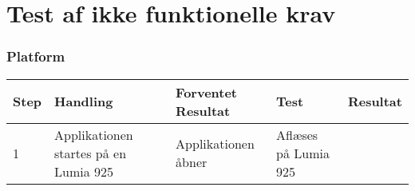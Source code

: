 \chapter{Test af ikke funktionelle krav}
 \label{chp:testikkefunktionelle}
 

\subsection{Platform}

\begin{longtable}{| p{0.7cm}  | p{3cm}  | p{4cm} |  p{3cm}  | p{3cm}  |}
\hline
Step & Handling & Forventet Resultat & Test & Resultat \\
\hline
1 & Applikationen startes på en Lumia 925 & Applikationen åbner & Aflæses på Lumia 925 & \FuckingHuge{\checkmark} \\
\hline
\end{longtable}

